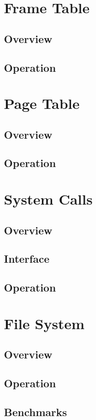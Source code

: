 \documentclass[12pt]{article}
\begin{document}
\section{Frame Table}
\subsection{Overview}
\subsection{Operation}

\section{Page Table}
\subsection{Overview}
\subsection{Operation}

\section{System Calls}
\subsection{Overview}
\subsection{Interface}
\subsection{Operation}

\section{File System}
\subsection{Overview}
\subsection{Operation}
\subsection{Benchmarks}
\end{document}
